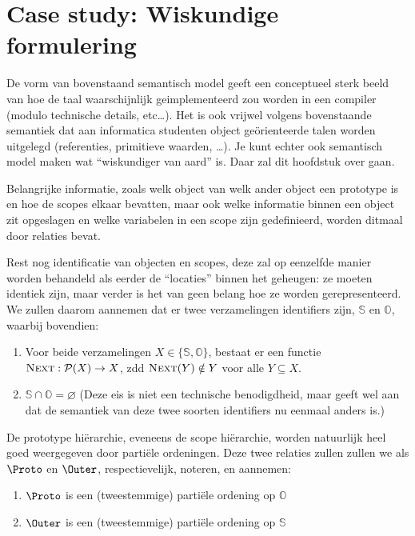 
\chapter{Case study: Wiskundige formulering}

De vorm van bovenstaand semantisch model geeft een conceptueel sterk beeld van hoe de taal waarschijnlijk geimplementeerd zou worden in een compiler (modulo technische details, etc\dots). Het is ook vrijwel volgens bovenstaande semantiek dat aan informatica studenten object geörienteerde talen worden uitgelegd (referenties, primitieve waarden, \dots). Je kunt echter ook semantisch model maken wat “wiskundiger van aard” is. Daar zal dit hoofdstuk over gaan.

Belangrijke informatie, zoals welk object van welk ander object een prototype is en hoe de scopes elkaar bevatten, maar ook welke informatie binnen een object zit opgeslagen en welke variabelen in een scope zijn gedefinieerd, worden ditmaal door relaties bevat.

Rest nog identificatie van objecten en scopes, deze zal op eenzelfde manier worden behandeld als eerder de “locaties” binnen het geheugen: ze moeten identiek zijn, maar verder is het van geen belang hoe ze worden gerepresenteerd. We zullen daarom aannemen dat er twee verzamelingen identifiers zijn, $\mathbb{S}$ en $\mathbb{O}$, waarbij bovendien:

\begin{enumerate}
	\item Voor beide verzamelingen $X \in \{\mathbb{S}, \mathbb{O}\}$, bestaat er een functie $\textsc{Next}:\mathcal{P}(X) \to X$, zdd $\textsc{Next}(Y) \notin Y$ voor alle $Y \subseteq X$.
	\item $\mathbb{S} \cap \mathbb{O} = \varnothing$ (Deze eis is niet een technische benodigdheid, maar geeft wel aan dat de semantiek van deze twee soorten identifiers nu eenmaal anders is.)
\end{enumerate}

De prototype hiërarchie, eveneens de scope hiërarchie, worden natuurlijk heel goed weergegeven door partiële ordeningen. Deze twee relaties zullen zullen we als $\Proto$ en $\Outer$, respectievelijk, noteren, en aannemen:

\begin{enumerate}
	\item $\Proto$ is een (tweestemmige) partiële ordening op $\mathbb{O}$
	\item $\Outer$ is een (tweestemmige) partiële ordening op $\mathbb{S}$
\end{enumerate}

